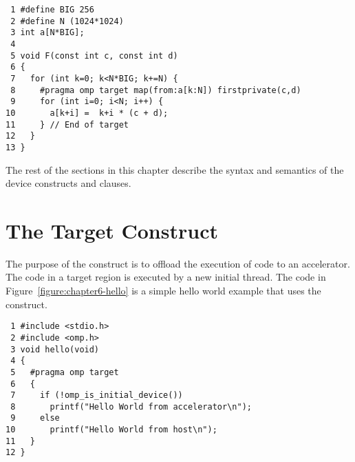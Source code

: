 \begin{figure*}[!tb]
\begin{verbatim}
 1 #define BIG 256
 2 #define N (1024*1024)
 3 int a[N*BIG];
 4 
 5 void F(const int c, const int d)
 6 {
 7   for (int k=0; k<N*BIG; k+=N) {
 8     #pragma omp target map(from:a[k:N]) firstprivate(c,d) 
 9     for (int i=0; i<N; i++) {
10       a[k+i] =  k+i * (c + d);
11     } // End of target
12   }
13 }
\end{verbatim}
\caption{ \textbf {Use array section to map a subset of an array} -- \small
          Map a slice of the array \texttt{a} each time through the loop.
         }
\label{figure:chapter6-mapslice}
\end{figure*}

The rest of the sections in this chapter describe 
the syntax and semantics of the device constructs and clauses.

\section{The Target Construct}
\label{sec:06.target-construct}

The purpose of the  construct is to offload the execution of code
to an accelerator.  The code in a target region is executed by a new
initial thread.  
The code in Figure~\ref{figure:chapter6-hello} is a simple 
hello world example that uses the  construct.  

\begin{figure*}[!tbhp]
\begin{verbatim}
 1 #include <stdio.h>
 2 #include <omp.h>
 3 void hello(void)
 4 {
 5   #pragma omp target 
 6   {
 7     if (!omp_is_initial_device())
 8       printf("Hello World from accelerator\n");
 9     else
10       printf("Hello World from host\n");
11   }
12 }
\end{verbatim}
\caption{ \textbf {Example of a target construct } -- \small
          If the initial thread is running on an accelerator, it executes the
          first \texttt{printf()}.
          Otherwise, it is running on the host device and
          executes the second \texttt{printf()}.
          Note that some implementations may not support calling \texttt{printf()} on an accelerator. 
         }
\label{figure:chapter6-hello}
\end{figure*}

